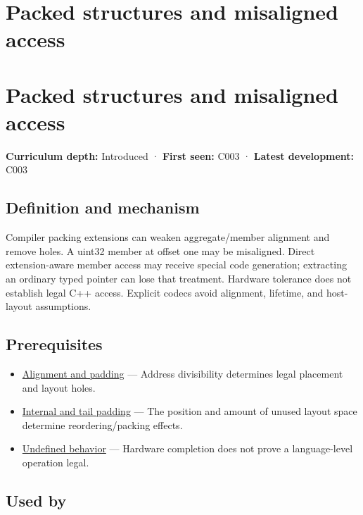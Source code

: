 \hypertarget{appendix-0682dbfc5f0e}{}
\section*{Packed structures and misaligned access}
\section{Packed structures and misaligned access}\label{appendix-0682dbfc5f0e-packed-structures-and-misaligned-access}

\textbf{Curriculum depth:} Introduced · \textbf{First seen:} C003 · \textbf{Latest development:} C003

\subsection{Definition and mechanism}\label{appendix-0682dbfc5f0e-definition-and-mechanism}

Compiler packing extensions can weaken aggregate/member alignment and remove holes. A uint32 member at offset one may be misaligned. Direct extension-aware member access may receive special code generation; extracting an ordinary typed pointer can lose that treatment. Hardware tolerance does not establish legal C++ access. Explicit codecs avoid alignment, lifetime, and host-layout assumptions.

\subsection{Prerequisites}\label{appendix-0682dbfc5f0e-prerequisites}

\begin{itemize}
\tightlist
\item
  \hyperref[appendix-a1f7c53b4742]{Alignment and padding} --- Address divisibility determines legal placement and layout holes.
\item
  \hyperref[appendix-f52f8c5a3afd]{Internal and tail padding} --- The position and amount of unused layout space determine reordering/packing effects.
\item
  \hyperref[appendix-f558f5b4d8f2]{Undefined behavior} --- Hardware completion does not prove a language-level operation legal.
\end{itemize}

\subsection{Used by}\label{appendix-0682dbfc5f0e-used-by}

